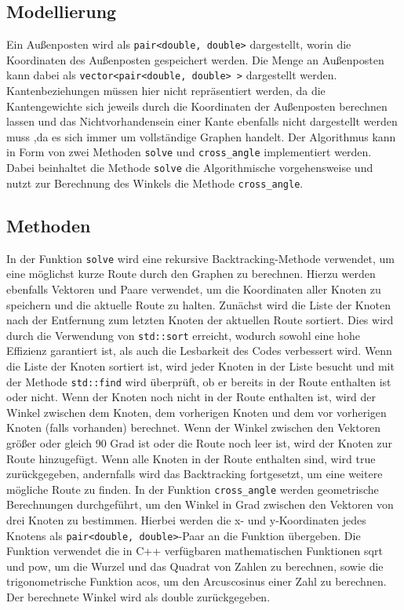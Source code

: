 \documentclass[a4paper,10pt,ngerman]{scrartcl}
\begin{document}
    \subsection{Modellierung}\label{subsec:modellierung}
    Ein Außenposten wird als \texttt{pair<double, double>} dargestellt, worin die Koordinaten des Außenposten gespeichert werden.
    Die Menge an Außenposten kann dabei als \texttt{vector<pair<double, double> >} dargestellt werden.
    Kantenbeziehungen müssen hier nicht repräsentiert werden, da die Kantengewichte sich jeweils durch die Koordinaten der Außenposten berechnen lassen
    und das Nichtvorhandensein einer Kante ebenfalls nicht dargestellt werden muss ,da es sich immer um vollständige Graphen handelt.
    Der Algorithmus kann in Form von zwei Methoden \texttt{solve} und \texttt{cross\_angle} implementiert werden.
    Dabei beinhaltet die Methode \texttt{solve} die Algorithmische vorgehensweise und nutzt zur Berechnung des Winkels die Methode \texttt{cross\_angle}.
    \subsection{Methoden}\label{subsec:methoden}
    In der Funktion \texttt{solve} wird eine rekursive Backtracking-Methode verwendet, um eine möglichst kurze Route durch den Graphen zu berechnen.
    Hierzu werden ebenfalls Vektoren und Paare verwendet, um die Koordinaten aller Knoten zu speichern und die aktuelle Route zu halten.
    Zunächst wird die Liste der Knoten nach der Entfernung zum letzten Knoten der aktuellen Route sortiert.
    Dies wird durch die Verwendung von \texttt{std::sort} erreicht, wodurch sowohl eine hohe Effizienz garantiert ist,
    als auch die Lesbarkeit des Codes verbessert wird.
    Wenn die Liste der Knoten sortiert ist, wird jeder Knoten in der Liste besucht und mit der Methode \texttt{std::find} wird überprüft,
    ob er bereits in der Route enthalten ist oder nicht.
    Wenn der Knoten noch nicht in der Route enthalten ist, wird der Winkel zwischen dem Knoten, dem vorherigen Knoten und dem vor vorherigen Knoten (falls vorhanden) berechnet.
    Wenn der Winkel zwischen den Vektoren größer oder gleich 90 Grad ist oder die Route noch leer ist, wird der Knoten zur Route hinzugefügt.
    Wenn alle Knoten in der Route enthalten sind, wird true zurückgegeben, andernfalls wird das Backtracking fortgesetzt, um eine weitere mögliche Route zu finden.
    \newline
    In der Funktion \texttt{cross\_angle} werden geometrische Berechnungen durchgeführt, um den Winkel in Grad zwischen den Vektoren von drei Knoten zu bestimmen.
    Hierbei werden die x- und y-Koordinaten jedes Knotens als \texttt{pair<double, double>}-Paar an die Funktion übergeben.
    Die Funktion verwendet die in C++ verfügbaren mathematischen Funktionen sqrt und pow, um die Wurzel und das Quadrat von Zahlen zu berechnen,
    sowie die trigonometrische Funktion acos, um den Arcuscosinus einer Zahl zu berechnen.
    Der berechnete Winkel wird als double zurückgegeben.
\end{document}
